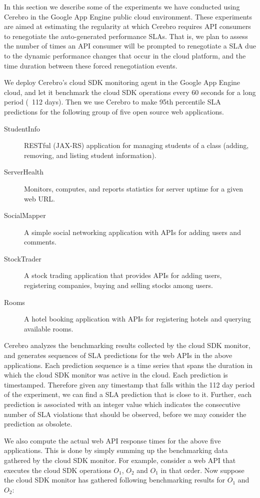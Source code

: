 In this section we describe some of the experiments we have conducted using Cerebro in the Google
App Engine public cloud environment. These experiments are aimed at estimating the regularity at
which Cerebro requires API consumers to renegotiate the auto-generated performance SLAs. That is,
we plan to assess the number of times an API consumer will be prompted to renegotiate a
SLA due to the dynamic performance changes that occur in the cloud platform, and the time duration
between these forced renegotiation events.

We deploy Cerebro's cloud SDK monitoring agent in the Google App Engine cloud, and let it benchmark
the cloud SDK operations every 60 seconds for a long period (~112 days). Then we use Cerebro
to make 95th percentile SLA predictions for the following group of five open source web applications. 

\begin{description}
\item[StudentInfo] RESTful (JAX-RS) application for managing
students of a class (adding, removing, and listing student information).
\item[ServerHealth] Monitors, computes, and reports statistics for server
uptime for a given web URL.
\item[SocialMapper] A simple social networking application with APIs for
adding users and comments.
\item[StockTrader] A stock trading application that
provides APIs for adding users, registering companies, buying and selling
stocks among users. 
\item[Rooms] A hotel booking application with APIs
for registering hotels and querying available rooms.
\end{description}

Cerebro analyzes the benchmarking results collected
by the cloud SDK monitor, and generates sequences of SLA predictions for the web APIs in the above
applications. Each prediction sequence
is a time series that spans the duration in which the cloud SDK monitor was active
in the cloud. Each prediction is timestamped. Therefore given any timestamp that falls within the
112 day period of the experiment, we can find a SLA prediction that is close to it. Further, each prediction
is associated with an integer value which indicates the consecutive number of SLA violations that should be
observed, before we may consider the prediction as obsolete.

We also compute the actual web API response times for the above five applications. This is done
by simply summing up the benchmarking data gathered by the cloud SDK monitor. For example,
consider a web API that executes the cloud SDK operations $O_{1}$, $O_{2}$ and $O_{1}$ in that order. 
Now suppose the cloud SDK monitor has gathered following benchmarking results for $O_{1}$ and
$O_{2}$:

